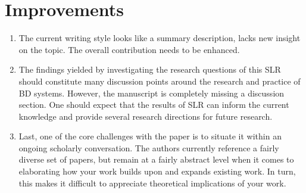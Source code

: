 \documentclass[review]{elsarticle}
\begin{document}




\section{Improvements}

\begin{enumerate}
    \item The current writing style looks like a summary description, lacks new insight on the topic. The overall contribution needs to be enhanced.
    \item The findings yielded by investigating the research questions of this SLR should constitute many discussion points around the research and practice of BD systems. However, the manuscript is completely missing a discussion section. One should expect that the results of SLR can inform the current knowledge and provide several research directions for future research. 
    \item Last, one of the core challenges with the paper is to situate it within an ongoing scholarly conversation. The authors currently reference a fairly diverse set of papers, but remain at a fairly abstract level when it comes to elaborating how your work builds upon and expands existing work. In turn, this makes it difficult to appreciate theoretical implications of your work. 
\end{enumerate}
 


\end{document}
